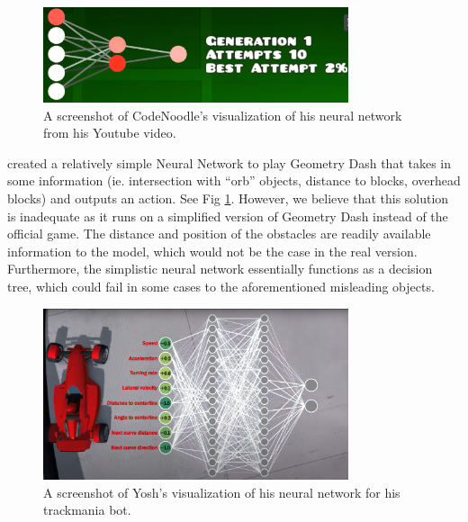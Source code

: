 \documentclass{article} %
\begin{document}
\begin{figure}[!h]
\begin{center}
\includegraphics[width=0.8\textwidth]{Figs/CodeNoodlesScreenshot.png}
\end{center}
\caption{A screenshot of CodeNoodle's visualization of his neural network
from his Youtube video. 
\citep{AI+Learns+to+Play+GD}}
\label{fig:Code_Noodles}
\end{figure}

\cite{AI+Learns+to+Play+GD} created a relatively simple 
Neural Network to play Geometry Dash that takes in 
some information (ie. intersection with  “orb” objects, 
distance to blocks, overhead blocks) and outputs an action.
See Fig \ref{fig:Code_Noodles}.
However, we believe 
that this solution is inadequate as it runs on a simplified 
version of Geometry Dash instead of the official game. The 
distance and position of the obstacles are readily available 
information to the model, which would not be the case in the 
real version. Furthermore, the simplistic neural network 
essentially functions as a decision tree, which could fail 
in some cases to the aforementioned misleading objects.

\begin{figure}[!h]
\begin{center}
\includegraphics[width=0.8\textwidth]{Figs/Trackmania_AI_neural_network.png}
\end{center}
\caption{A screenshot of Yosh's visualization of his neural network
for his trackmania bot. 
\citep{Trackmania+AI}}
\label{fig:Trackmania_AI}
\end{figure}
\end{document}
